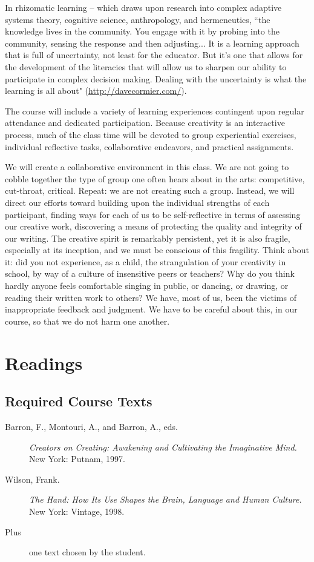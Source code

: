\documentclass[letterpaper,10pt,headsepline]{scrreprt}
\begin{document}
In rhizomatic learning -- which draws upon research into complex adaptive systems theory, cognitive science, anthropology, and hermeneutics, ``the knowledge lives in the community. You engage with it by probing into the community, sensing the response and then adjusting... It is a learning approach that is full of uncertainty, not least for the educator. But it's one that allows for the development of the literacies that will allow us to sharpen our ability to participate in complex decision making. Dealing with the uncertainty is what the learning is all about"  (\url{http://davecormier.com/}).

The course will include a variety of learning experiences contingent upon regular attendance and dedicated participation. Because creativity is an interactive process, much of the class time will be devoted to group experiential exercises, individual reflective tasks, collaborative endeavors, and practical assignments.

We will create a collaborative environment in this class. We are not going to cobble together the type of group one often hears about in the arts: competitive, cut-throat, critical. Repeat: we are not creating such a group. Instead, we will direct our efforts toward building upon the individual strengths of each participant, finding ways for each of us to be self-reflective in terms of assessing our creative work, discovering a means of protecting the quality and integrity of our writing. The creative spirit is remarkably persistent, yet it is also fragile, especially at its inception, and
we must be conscious of this fragility. Think about it: did you not experience, as a child, the strangulation of your creativity in school, by way of a culture of insensitive peers or teachers? Why do you think hardly anyone feels comfortable singing in public, or dancing, or drawing, or reading their written work to others? We have, most of us, been the victims of inappropriate feedback and judgment. We have to be careful about this, in our course, so that we do not harm one another.

\section{Readings}
\subsection{Required Course Texts}

\begin{description}
\item [Barron, F., Montouri, A., and Barron, A., eds.] \textit{Creators on Creating: Awakening and Cultivating the Imaginative Mind.} 
\\New York: Putnam, 1997.
\item[Wilson, Frank.] \textit{The Hand: How Its Use Shapes the Brain, Language and Human Culture.}
\\New York: Vintage, 1998.
\item[Plus] {one text chosen by the student.}
\end{description}
\end{document}
